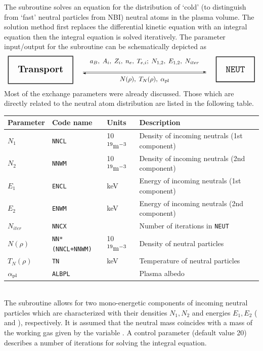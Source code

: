 The subroutine  solves an equation for the distribution of
`cold' (to distinguish from `fast' neutral particles from NBI) neutral
atoms in the plasma volume.  
The solution method first replaces the differential kinetic equation
 with an integral equation \cite{DK} then the integral equation
is solved iteratively. 
The parameter input/output for the subroutine can be schematically
depicted as 
$$
\begin{array}{lcr}
\fboxrule=1pt			\fboxsep=5mm
\fbox{\Large\bf Transport}
&
\begin{array}{c}
a_B,\;A_i,\;Z_i,\;n_e,\;T_{e,i};\;N_{1,2},\;E_{1,2},\;N_{iter}\\
\vector( 1,0){190}\\[-10pt]
\vector(-1,0){190}\\
N(\rho),\;T_N(\rho),\;\alpha_{\rm pl}
\end{array}
&
\fboxrule=1pt			\fboxsep=5mm
\fbox{\Large\tt NEUT}
\end{array}
$$
Most of the exchange parameters were already discussed.
Those which are directly related to the neutral atom distribution are 
listed in the following table.
\\[2ex]
\begin{tabular}{| l | l | l | l |}				\hline
\bf Parameter\hspace*{-4pt}&\bf Code name&\bf Units &\bf Description\\
								\hline
$N_1$	& {\tt NNCL}	&10$^{19}\rm m^{-3}$\hspace*{-7pt}
	& Density of incoming neutrals (1st component)\\
$N_2$	& {\tt NNWM}	&10$^{19}\rm m^{-3}$\hspace*{-7pt}
	& Density of incoming neutrals (2nd component)\\ 
$E_1$	& {\tt ENCL}	&keV	
	& Energy of incoming neutrals (1st component)\\
$E_2$	& {\tt ENWM}	&keV	
	& Energy of incoming neutrals (2nd component)\\
$N_{iter}$&\tt NNCX	& & Number of iterations in {\tt NEUT}\\ \hline
$N(\rho)$&\tt NN*(NNCL+NNWM)\hspace*{-4pt}&10$^{19}\rm m^{-3}$
		\hspace*{-7pt}&Density of neutral particles\\ 
$T_N(\rho)$&{\tt TN}	&keV& Temperature of neutral particles\\ 
$\alpha_{\rm pl}$&{\tt ALBPL}&	& Plasma albedo\\ \hline
\end{tabular}
\bigskip \\
The subroutine allows for two mono-energetic components of incoming
neutral particles which are characterized with their densities 
$N_1,N_2$ and energies $E_1,E_2$ ( and ),
respectively. 
It is assumed that the neutral mass coincides with a mass of the working
gas given by the variable .
A control parameter  (default value 20) describes a number of
iterations for solving the integral equation.

